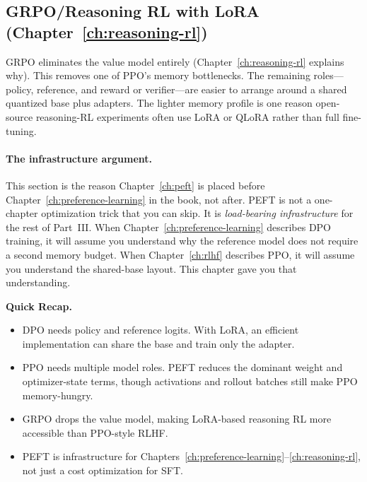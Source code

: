 \subsection{GRPO/Reasoning RL with LoRA (Chapter~\ref{ch:reasoning-rl})}

GRPO eliminates the value model entirely (Chapter~\ref{ch:reasoning-rl} explains why). This removes one of PPO's memory bottlenecks. The remaining roles---policy, reference, and reward or verifier---are easier to arrange around a shared quantized base plus adapters. The lighter memory profile is one reason open-source reasoning-RL experiments often use LoRA or QLoRA rather than full fine-tuning.

\paragraph{The infrastructure argument.} This section is the reason Chapter~\ref{ch:peft} is placed before Chapter~\ref{ch:preference-learning} in the book, not after. PEFT is not a one-chapter optimization trick that you can skip. It is \emph{load-bearing infrastructure} for the rest of Part~III. When Chapter~\ref{ch:preference-learning} describes DPO training, it will assume you understand why the reference model does not require a second memory budget. When Chapter~\ref{ch:rlhf} describes PPO, it will assume you understand the shared-base layout. This chapter gave you that understanding.

\begin{quickrecap}
\textbf{Quick Recap.}
\begin{itemize}[nosep,leftmargin=1.5em]
  \item DPO needs policy and reference logits. With LoRA, an efficient implementation can share the base and train only the adapter.
  \item PPO needs multiple model roles. PEFT reduces the dominant weight and optimizer-state terms, though activations and rollout batches still make PPO memory-hungry.
  \item GRPO drops the value model, making LoRA-based reasoning RL more accessible than PPO-style RLHF.
  \item PEFT is infrastructure for Chapters~\ref{ch:preference-learning}--\ref{ch:reasoning-rl}, not just a cost optimization for SFT.
\end{itemize}
\end{quickrecap}


